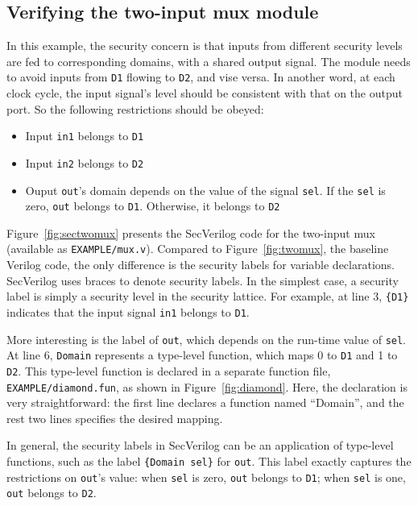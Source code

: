 \documentclass [12pt, oneside, a4paper]{article}
\newcommand{\code}[1]{\texttt{#1}}
\begin{document}
{%
\subsection{Verifying the two-input mux module}

In this example, the security concern is that inputs from different security
levels are fed to corresponding domains, with a shared output signal. The module
needs to avoid inputs from \code{D1} flowing to \code{D2}, and vise versa. In
another word, at each clock cycle, the input signal's level should be
consistent with that on the output port. So the following restrictions should
be obeyed:
\begin{itemize}
	\item Input \code{in1} belongs to \code{D1}
	\item Input \code{in2} belongs to \code{D2}
	\item Ouput \code{out}'s domain depends on the value of the signal \code{sel}. If the \code{sel} is zero, \code{out} belongs to \code{D1}. Otherwise, it belongs to \code{D2} 
\end{itemize}

Figure~\ref{fig:sectwomux} presents the SecVerilog code for the
two-input mux (available as \code{EXAMPLE/mux.v}).
Compared to Figure~\ref{fig:twomux}, the baseline Verilog code, the only
difference is the security labels for variable declarations. SecVerilog uses
braces to denote security labels. In the simplest case, a security label is
simply a security level in the security lattice. For example, at line 3,
\code{\{D1\}} indicates that the input signal \code{in1} belongs to \code{D1}.

More interesting is the label of \code{out}, which depends on the run-time
value of \code{sel}. At line 6, \code{Domain} represents a type-level function,
which maps 0 to \code{D1} and 1 to \code{D2}. This type-level function is
declared in a separate function file, \code{EXAMPLE/diamond.fun}, as shown in
Figure~\ref{fig:diamond}.  Here, the declaration is very
straightforward: the first line declares a function named ``Domain'', and the
rest two lines specifies the desired mapping.

In general, the security labels in SecVerilog can be an application of
type-level functions, such as the label \code{\{Domain sel\}} for
\code{out}. This label exactly captures the restrictions on
\code{out}'s value: when \code{sel} is zero, \code{out} belongs to \code{D1};
when \code{sel} is one, \code{out} belongs to \code{D2}.

}
\end{document}

